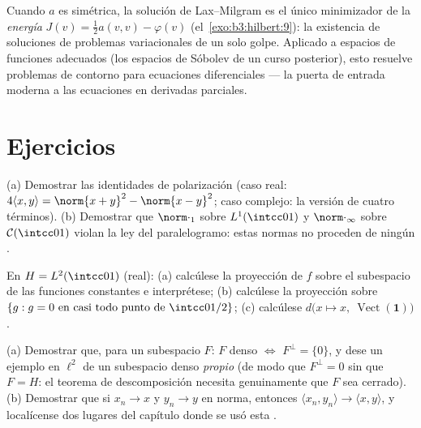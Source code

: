 \begin{remark}\label{rem:b3:hilbert:variational}
Cuando $a$ es simétrica, la solución de Lax--Milgram es el único
minimizador de la \emph{energía} $J(v) = \frac12a(v,v) -
\varphi(v)$ (el~\cref{exo:b3:hilbert:9}): la existencia de soluciones de
problemas variacionales de un solo golpe. Aplicado a espacios de
funciones adecuados (los espacios de Sóbolev de un curso posterior),
esto resuelve problemas de contorno para ecuaciones diferenciales --- la
puerta de entrada moderna a las ecuaciones en derivadas parciales.
\end{remark}

\section{Ejercicios}

\begin{exercise}[$\star$]\label{exo:b3:hilbert:1}
(a) Demostrar las identidades de polarización (caso real: $4\langle x,
y\rangle = \norm{x+y}^2 - \norm{x-y}^2$; caso complejo: la versión de
cuatro términos). (b) Demostrar que $\norm\cdot_1$ sobre $L^1(\intcc01)$
y $\norm\cdot_\infty$ sobre $\mathcal C(\intcc01)$ violan la ley del
paralelogramo: estas normas no proceden de ningún
.
\end{exercise}

\begin{exercise}[$\star$]\label{exo:b3:hilbert:2}
En $H = L^2(\intcc01)$ (real): (a) calcúlese la proyección de $f$ sobre
el subespacio de las funciones constantes e interprétese; (b) calcúlese
la proyección sobre $\{g : g = 0 \text{ en casi todo punto de }
\intcc0{1/2}\}$; (c) calcúlese
$d\bigl(x \mapsto x,\ \operatorname{Vect}(\mathbf
1)\bigr)$.
\end{exercise}

\begin{exercise}[$\star\star$]\label{exo:b3:hilbert:3}
(a) Demostrar que, para un subespacio $F$: $F$ denso $\iff$ $F^\perp =
\{0\}$, y dese un ejemplo en $\ell^2$ de un subespacio denso
\emph{propio} (de modo que $F^\perp = 0$ sin que $F = H$: el teorema de
descomposición necesita genuinamente que $F$ sea cerrado). (b) Demostrar
que si $x_n \to x$ y $y_n \to y$ en norma, entonces
$\langle x_n, y_n\rangle \to \langle x, y\rangle$, y localícense dos
lugares del capítulo donde se usó esta
.
\end{exercise}

